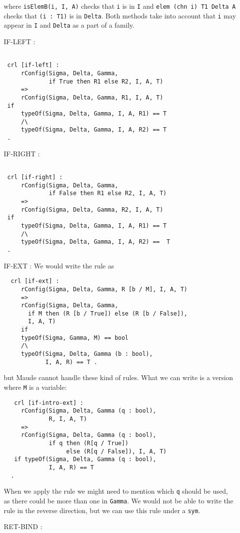 \documentclass{article}
\begin{document}
\begin{itemize}
\begin{lstlisting}
  \end{lstlisting}
  
 \noindent where 
 \texttt{isElemB(i, I, A)} checks that \texttt{i} is in \texttt{I}
  and 
 \texttt{elem (chn i) T1 Delta A} checks that 
 \texttt{(i : T1)} is in \texttt{Delta}.
 Both methods take into account that \texttt{i} may appear in 
 \texttt{I} and \texttt{Delta} as a part of a family.  
\item[IF-LEFT]:
\begin{lstlisting}
                             
 crl [if-left] : 
     rConfig(Sigma, Delta, Gamma, 
             if True then R1 else R2, I, A, T) 
     =>  
     rConfig(Sigma, Delta, Gamma, R1, I, A, T)
 if
     typeOf(Sigma, Delta, Gamma, I, A, R1) == T
     /\
     typeOf(Sigma, Delta, Gamma, I, A, R2) == T 
 .
  \end{lstlisting} 
\item[IF-RIGHT]:
\begin{lstlisting}

 crl [if-right] : 
     rConfig(Sigma, Delta, Gamma, 
             if False then R1 else R2, I, A, T) 
     =>  
     rConfig(Sigma, Delta, Gamma, R2, I, A, T)
 if
     typeOf(Sigma, Delta, Gamma, I, A, R1) == T 
     /\
     typeOf(Sigma, Delta, Gamma, I, A, R2) ==  T 
 . 

 \end{lstlisting} 
\item[IF-EXT]:
We would write the rule as
\begin{lstlisting}
  crl [if-ext] : 
     rConfig(Sigma, Delta, Gamma, R [b / M], I, A, T)
     => 
     rConfig(Sigma, Delta, Gamma, 
       if M then (R [b / True]) else (R [b / False]), 
       I, A, T)
     if
     typeOf(Sigma, Gamma, M) == bool
     /\
     typeOf(Sigma, Delta, Gamma (b : bool), 
            I, A, R) == T . 
\end{lstlisting}            
\noindent but Maude cannot handle these kind of rules.
What we can write is a version where \texttt{M} is a variable:
\begin{lstlisting}
   crl [if-intro-ext] :
     rConfig(Sigma, Delta, Gamma (q : bool), 
             R, I, A, T) 
     => 
     rConfig(Sigma, Delta, Gamma (q : bool),
             if q then (R[q / True]) 
                  else (R[q / False]), I, A, T) 
   if typeOf(Sigma, Delta, Gamma (q : bool), 
             I, A, R) == T                   
  .  
 \end{lstlisting} 
\noindent When we apply the rule we might need to mention which \texttt{q} 
should be used, as there could be more than one in  \texttt{Gamma}. 
We would not be able to write the rule in the reverse direction, but we
can use this rule under a \texttt{sym}.
\item[RET-BIND]:
\begin{lstlisting}           


\end{lstlisting}
\end{itemize}
\end{document}
